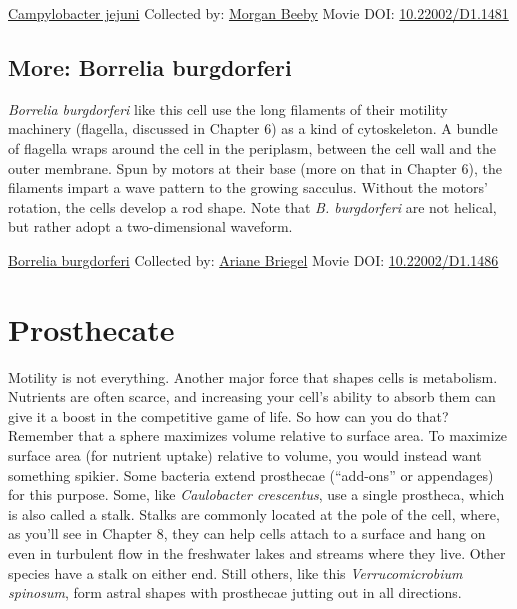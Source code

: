 \documentclass[]{tufte-book}
\begin{document}
\hypertarget{htmlwidget-69c330249529a7f10276}{}

\label{fig:3-5}\protect\hyperlink{tree}{Campylobacter jejuni} Collected by: \protect\hyperlink{morgan_beeby}{Morgan Beeby} Movie DOI: \href{https://doi.org/10.22002/D1.1481}{10.22002/D1.1481}

\hypertarget{Borrelia_burgdorferi}{%
\subsection*{More: Borrelia burgdorferi}\label{Borrelia_burgdorferi}}

\emph{Borrelia burgdorferi} like this cell use the long filaments of their motility machinery (flagella, discussed in Chapter 6) as a kind of cytoskeleton. A bundle of flagella wraps around the cell in the periplasm, between the cell wall and the outer membrane. Spun by motors at their base (more on that in Chapter 6), the filaments impart a wave pattern to the growing sacculus. Without the motors' rotation, the cells develop a rod shape. Note that \emph{B. burgdorferi} are not helical, but rather adopt a two-dimensional waveform.



\hypertarget{htmlwidget-dac8c9e513d18e465014}{}

\label{fig:3-5a}\protect\hyperlink{tree}{Borrelia burgdorferi} Collected by: \protect\hyperlink{ariane_briegel}{Ariane Briegel} Movie DOI: \href{https://doi.org/10.22002/D1.1486}{10.22002/D1.1486}

\hypertarget{prosthecate}{%
\section{Prosthecate}\label{prosthecate}}

Motility is not everything. Another major force that shapes cells is metabolism. Nutrients are often scarce, and increasing your cell's ability to absorb them can give it a boost in the competitive game of life. So how can you do that? Remember that a sphere maximizes volume relative to surface area. To maximize surface area (for nutrient uptake) relative to volume, you would instead want something spikier. Some bacteria extend prosthecae (``add-ons'' or appendages) for this purpose. Some, like \emph{Caulobacter crescentus}, use a single prostheca, which is also called a stalk. Stalks are commonly located at the pole of the cell, where, as you'll see in Chapter 8, they can help cells attach to a surface and hang on even in turbulent flow in the freshwater lakes and streams where they live. Other species have a stalk on either end. Still others, like this \emph{Verrucomicrobium spinosum}, form astral shapes with prosthecae jutting out in all directions.
\end{document}
